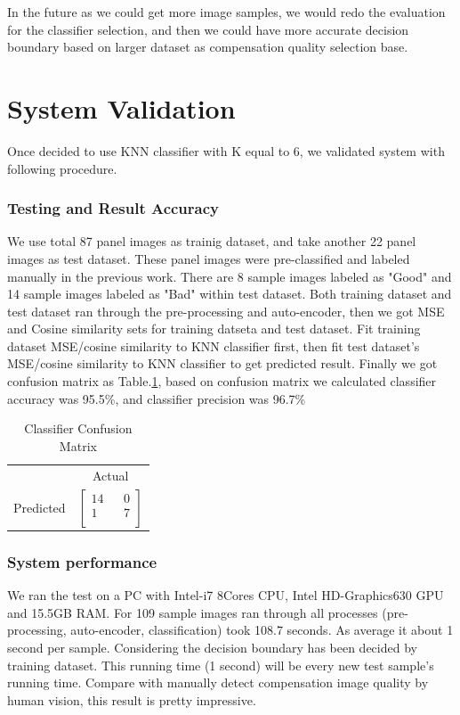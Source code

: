 \documentclass[runningheads]{llncs}
\begin{document}
In the future as we could get more image samples, we would redo the evaluation for the classifier selection, and then we could have more accurate decision boundary based on larger dataset as compensation quality selection base.

\section{System Validation}
Once decided to use KNN classifier with K equal to 6,  we validated system with following procedure.
\subsubsection{Testing and Result Accuracy}
We use total 87 panel images as trainig dataset, and take another 22 panel images as test dataset. These panel images were pre-classified and labeled manually in the previous work. There are 8 sample images labeled as "Good" and 14 sample images labeled as "Bad" within test dataset. Both training dataset and test dataset ran through the pre-processing and auto-encoder, then we got MSE and Cosine similarity sets for training datseta and test dataset. Fit training dataset MSE/cosine similarity to KNN classifier first, then fit test dataset's MSE/cosine similarity to KNN classifier to get predicted result.
Finally we got confusion matrix as Table.\ref{tab:cm}, based on confusion matrix we calculated classifier accuracy was 95.5\%, and classifier precision was 96.7\%\\
\begin{table}
    \centering
    \caption{Classifier Confusion Matrix}
    \label{tab:cm}
    \begin{tabular}{cc}
         & Actual \\
        Predicted & $\begin{bmatrix} 14 & & 0 \\ 1 & & 7\\ \end{bmatrix}$\\
    \end{tabular}
\end{table}
\subsubsection{System performance}
We ran the test on a PC with Intel-i7 8Cores CPU, Intel HD-Graphics630 GPU and 15.5GB RAM. For 109 sample images ran through all processes (pre-processing, auto-encoder, classification) took 108.7 seconds. As average it about 1 second per sample. Considering the decision boundary has been decided by training dataset. This running time (1 second) will be every new test sample's running time. Compare with manually detect compensation image quality by human vision, this result is pretty impressive.
\end{document}
